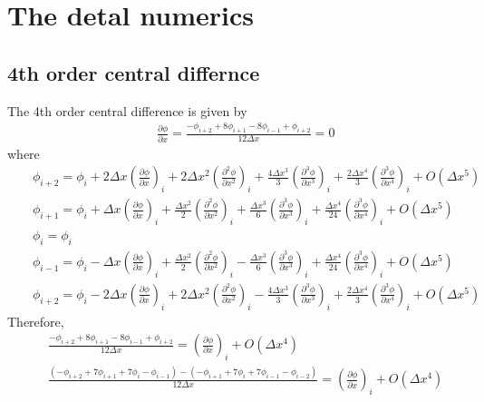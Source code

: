 \chapter{The detal numerics}
\section{4th order central differnce}
{
\footnotesize
The 4th order central difference is given by
\begin{eqnarray}
&& \frac{\partial \phi}{\partial x}
=\frac{-\phi_{i+2}+8\phi_{i+1}-8\phi_{i-1}+\phi_{i+2}}{12\Delta x} = 0
\end{eqnarray}
where
\begin{eqnarray}
&& \phi_{i+2} = \phi_{i}
+ 2 \Delta x \left(\frac{\partial \phi}{\partial x}\right)_{i}
+ 2 \Delta x^2 \left(\frac{\partial^2 \phi}{\partial x^2}\right)_{i}
+ \frac{4 \Delta x^3}{3} \left(\frac{\partial^3 \phi}{\partial x^3}\right)_{i}
+ \frac{2 \Delta x^4}{3} \left(\frac{\partial^3 \phi}{\partial x^4}\right)_{i}
+ O(\Delta x^5)\\
&& \phi_{i+1} = \phi_{i}
+ \Delta x \left(\frac{\partial \phi}{\partial x}\right)_{i}
+ \frac{\Delta x^2}{2} \left(\frac{\partial^2 \phi}{\partial x^2}\right)_{i}
+ \frac{\Delta x^3}{6} \left(\frac{\partial^3 \phi}{\partial x^3}\right)_{i}
+ \frac{\Delta x^4}{24} \left(\frac{\partial^3 \phi}{\partial x^4}\right)_{i}
+ O(\Delta x^5)\\
&& \phi_i = \phi_i\\
&& \phi_{i-1} = \phi_{i}
- \Delta x \left(\frac{\partial \phi}{\partial x}\right)_{i}
+ \frac{\Delta x^2}{2} \left(\frac{\partial^2 \phi}{\partial x^2}\right)_{i}
- \frac{\Delta x^3}{6} \left(\frac{\partial^3 \phi}{\partial x^3}\right)_{i}
+ \frac{\Delta x^4}{24} \left(\frac{\partial^3 \phi}{\partial x^4}\right)_{i}
+ O(\Delta x^5)\\
&& \phi_{i+2} = \phi_{i}
- 2 \Delta x \left(\frac{\partial \phi}{\partial x}\right)_{i}
+ 2 \Delta x^2 \left(\frac{\partial^2 \phi}{\partial x^2}\right)_{i}
- \frac{4 \Delta x^3}{3} \left(\frac{\partial^3 \phi}{\partial x^3}\right)_{i}
+ \frac{2 \Delta x^4}{3} \left(\frac{\partial^3 \phi}{\partial x^4}\right)_{i}
+ O(\Delta x^5)
\end{eqnarray}
Therefore,
\begin{eqnarray}
&&
\frac{-\phi_{i+2}+8\phi_{i+1}-8\phi_{i-1}+\phi_{i+2}}{12\Delta x}
= \left(\frac{\partial \phi}{\partial x}\right)_{i}+ O(\Delta x^4)\\
&&
\frac{(-\phi_{i+2}+7\phi_{i+1}+7\phi_{i}-\phi_{i-1})-
(-\phi_{i+1}+7\phi_{i}+7\phi_{i-1}-\phi_{i-2})}{12\Delta x}
= \left(\frac{\partial \phi}{\partial x}\right)_{i}+ O(\Delta x^4)
\end{eqnarray}


}
